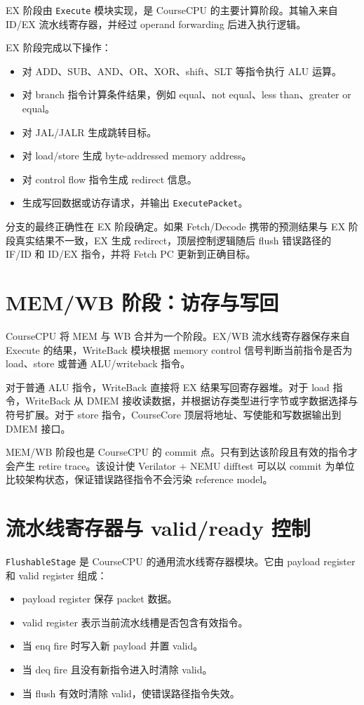 \documentclass[UTF8,a4paper,12pt]{ctexrep}
\begin{document}
EX 阶段由 \texttt{Execute} 模块实现，是 CourseCPU 的主要计算阶段。其输入来自 ID/EX 流水线寄存器，并经过 operand forwarding 后进入执行逻辑。

EX 阶段完成以下操作：

\begin{itemize}
  \item 对 ADD、SUB、AND、OR、XOR、shift、SLT 等指令执行 ALU 运算。
  \item 对 branch 指令计算条件结果，例如 equal、not equal、less than、greater or equal。
  \item 对 JAL/JALR 生成跳转目标。
  \item 对 load/store 生成 byte-addressed memory address。
  \item 对 control flow 指令生成 redirect 信息。
  \item 生成写回数据或访存请求，并输出 \texttt{ExecutePacket}。
\end{itemize}

分支的最终正确性在 EX 阶段确定。如果 Fetch/Decode 携带的预测结果与 EX 阶段真实结果不一致，EX 生成 redirect，顶层控制逻辑随后 flush 错误路径的 IF/ID 和 ID/EX 指令，并将 Fetch PC 更新到正确目标。

\section{MEM/WB 阶段：访存与写回}

CourseCPU 将 MEM 与 WB 合并为一个阶段。EX/WB 流水线寄存器保存来自 Execute 的结果，WriteBack 模块根据 memory control 信号判断当前指令是否为 load、store 或普通 ALU/writeback 指令。

对于普通 ALU 指令，WriteBack 直接将 EX 结果写回寄存器堆。对于 load 指令，WriteBack 从 DMEM 接收读数据，并根据访存类型进行字节或字数据选择与符号扩展。对于 store 指令，CourseCore 顶层将地址、写使能和写数据输出到 DMEM 接口。

MEM/WB 阶段也是 CourseCPU 的 commit 点。只有到达该阶段且有效的指令才会产生 retire trace。该设计使 Verilator + NEMU difftest 可以以 commit 为单位比较架构状态，保证错误路径指令不会污染 reference model。

\section{流水线寄存器与 valid/ready 控制}

\texttt{FlushableStage} 是 CourseCPU 的通用流水线寄存器模块。它由 payload register 和 valid register 组成：

\begin{itemize}
  \item payload register 保存 packet 数据。
  \item valid register 表示当前流水线槽是否包含有效指令。
  \item 当 enq fire 时写入新 payload 并置 valid。
  \item 当 deq fire 且没有新指令进入时清除 valid。
  \item 当 flush 有效时清除 valid，使错误路径指令失效。
\end{itemize}
\end{document}
